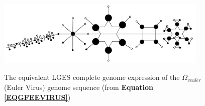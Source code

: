 \documentclass[a4paper, 18pt]{book} %
\begin{document}
\begin{figure}[H]
  \begin{center}
   \includegraphics[trim=0cm 0cm 0cm 0cm, clip, width=0.9\textwidth,]{resources/pdfs/PLATONIC-EULERVIRUS-landscape.pdf}\\
   \caption{The equivalent LGES complete genome expression of the $\Omega_{veuler}$ (Euler Virus) genome sequence (from \textbf{Equation \ref{EQGFEEVIRUS}})}
  \label{FIGLGESEULERVIRUS}
  \end{center}
\end{figure}
\end{document}
